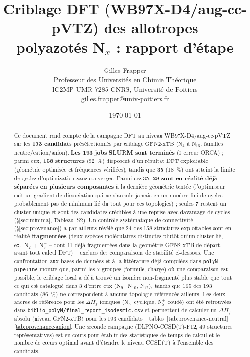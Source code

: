 \documentclass[11pt,a4paper]{article}
\title{\color{accent}\textbf{Criblage DFT (WB97X-D4/aug-cc-pVTZ) des allotropes\\
polyazot\'es N$_x$ : rapport d'\'etape}}
\author{Gilles Frapper \\ Professeur des Universit\'es en Chimie Th\'eorique \\ IC2MP UMR 7285 CNRS, Universit\'e de Poitiers \\[2pt] \small \href{mailto:gilles.frapper@univ-poitiers.fr}{gilles.frapper@univ-poitiers.fr}}
\date{\today}
\begin{document}
\maketitle
\thispagestyle{fancy}

\begin{abstract}
\noindent Ce document rend compte de la campagne DFT au niveau
WB97X-D4/aug-cc-pVTZ sur les \textbf{193 candidats} pr\'es\'electionn\'es
par criblage GFN2-xTB (N$_4$ \`a N$_{16}$, familles neutre/cation/anion).
\textbf{Les 193 jobs SLURM sont termin\'es} (0 erreur ORCA) ; parmi eux,
\textbf{158 structures} (82~\%) disposent d'un r\'esultat DFT exploitable
(g\'eom\'etrie optimis\'ee et fr\'equences v\'erifi\'ees), tandis que
\textbf{35} (18~\%) ont atteint la limite de cycles d'optimisation sans
converger. Parmi ces 35, \textbf{28 sont en r\'ealit\'e d\'ej\`a
s\'epar\'ees en plusieurs composantes} \`a la derni\`ere g\'eom\'etrie
tent\'ee (l'optimiseur suit un gradient de dissociation qui ne s'annule
jamais en un nombre fini de cycles -- probablement pas de minimum li\'e
du tout pour ces topologies) ; seules \textbf{7} restent un cluster
unique et sont des candidates cr\'edibles \`a une reprise avec davantage
de cycles (\S\ref{sec:minima}, Tableau~S2). Un contr\^ole syst\'ematique de connectivit\'e
(\S\ref{sec:provenance}) a par ailleurs r\'ev\'el\'e que 24 des 158
structures exploitables sont en r\'ealit\'e \textbf{fragment\'ees} (deux
esp\`eces mol\'eculaires distinctes plut\^ot qu'un cluster li\'e, ex.\
N$_2$ + N$_3^-$ -- dont 11 d\'ej\`a fragment\'ees dans la g\'eom\'etrie
GFN2-xTB de d\'epart, avant tout calcul DFT) -- exclues des comparaisons
de stabilit\'e ci-dessous. Une confrontation aux bases de donn\'ees et
\`a la litt\'erature d\'ej\`a compil\'ees dans \texttt{polyN-pipeline}
montre que, parmi les 7 groupes (formule, charge) o\`u une comparaison
est possible, le criblage local a d\'ej\`a trouv\'e un isom\`ere
non-fragment\'e plus stable que tout ce qui est catalogu\'e dans 3
d'entre eux (N$_9^-$, N$_{10}$, N$_{12}$), tandis que 165 des 193
candidats (86~\%) ne correspondent \`a aucune topologie r\'ef\'erenc\'ee
ailleurs. Les deux ancres de r\'ef\'erence pour les $\Delta H_f$ ioniques
(N$_5^-$ cyclique, N$_5^+$ coud\'e) ont \'et\'e retrouv\'ees dans
\texttt{biblio\_polyN/final\_report\_isodesmic.csv} et permettent de
calculer un $\Delta H_f$ absolu (niveau GFN2-xTB) pour les 193 candidats
-- tables~\ref{tab:provenance-neutral}--\ref{tab:provenance-anion}. Une
seconde campagne (DLPNO-CCSD(T)-F12, 49 structures repr\'esentatives)
est en cours pour \'etablir des statistiques de temps de calcul et le
nombre de c\oe urs optimal avant d'\'etendre le niveau CCSD(T) \`a
l'ensemble des candidats.
\end{abstract}
\end{document}
